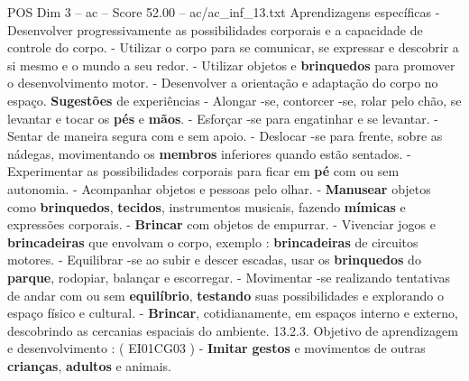 \begin{textsample}{POS Dim 3 – ac – Score 52.00 – ac/ac\_inf\_13.txt}
Aprendizagens específicas - Desenvolver progressivamente as possibilidades corporais e a capacidade de controle do corpo. - Utilizar o corpo para se comunicar, se expressar e descobrir a si mesmo e o mundo a seu redor. - Utilizar objetos e \textbf{brinquedos} para promover o desenvolvimento motor. - Desenvolver a orientação e adaptação do corpo no espaço. \textbf{Sugestões} de experiências - Alongar -se, contorcer -se, rolar pelo chão, se levantar e tocar os \textbf{pés} e \textbf{mãos}. - Esforçar -se para engatinhar e se levantar. - Sentar de maneira segura com e sem apoio. - Deslocar -se para frente, sobre as nádegas, movimentando os \textbf{membros} inferiores quando estão sentados. - Experimentar as possibilidades corporais para ficar em \textbf{pé} com ou sem autonomia. - Acompanhar objetos e pessoas pelo olhar. - \textbf{Manusear} objetos como \textbf{brinquedos}, \textbf{tecidos}, instrumentos musicais, fazendo \textbf{mímicas} e expressões corporais. - \textbf{Brincar} com objetos de empurrar. - Vivenciar jogos e \textbf{brincadeiras} que envolvam o corpo, exemplo : \textbf{brincadeiras} de circuitos motores. - Equilibrar -se ao subir e descer escadas, usar os \textbf{brinquedos} do \textbf{parque}, rodopiar, balançar e escorregar. - Movimentar -se realizando tentativas de andar com ou sem \textbf{equilíbrio}, \textbf{testando} suas possibilidades e explorando o espaço físico e cultural. - \textbf{Brincar}, cotidianamente, em espaços interno e externo, descobrindo as cercanias espaciais do ambiente. 13.2.3.
Objetivo de aprendizagem e desenvolvimento : ( EI01CG03 ) - \textbf{Imitar} \textbf{gestos} e movimentos de outras \textbf{crianças}, \textbf{adultos} e animais.

\end{textsample}
